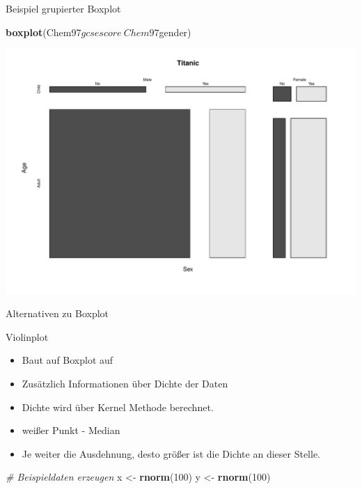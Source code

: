 \documentclass[ignorenonframetext,]{beamer}
\newenvironment{Shaded}{}{}
\newcommand{\KeywordTok}[1]{\textcolor[rgb]{0.00,0.44,0.13}{\textbf{{#1}}}}
\newcommand{\DecValTok}[1]{\textcolor[rgb]{0.25,0.63,0.44}{{#1}}}
\newcommand{\StringTok}[1]{\textcolor[rgb]{0.25,0.44,0.63}{{#1}}}
\newcommand{\CommentTok}[1]{\textcolor[rgb]{0.38,0.63,0.69}{\textit{{#1}}}}
\newcommand{\NormalTok}[1]{{#1}}
\providecommand{\tightlist}{%
\setlength{\itemsep}{0pt}\setlength{\parskip}{0pt}}
\begin{document}
\begin{frame}[fragile]{Beispiel grupierter Boxplot}

\begin{Shaded}
\begin{Highlighting}[]
\KeywordTok{boxplot}\NormalTok{(Chem97$gcsescore~Chem97$gender)}
\end{Highlighting}
\end{Shaded}

\includegraphics{R_intern_files/figure-beamer/unnamed-chunk-215-1.pdf}

\end{frame}

\begin{frame}[fragile]{Alternativen zu Boxplot}

Violinplot

\begin{itemize}
\tightlist
\item
  Baut auf Boxplot auf
\item
  Zusätzlich Informationen über Dichte der Daten
\item
  Dichte wird über Kernel Methode berechnet.
\item
  weißer Punkt - Median
\item
  Je weiter die Ausdehnung, desto größer ist die Dichte an dieser
  Stelle.
\end{itemize}

\begin{Shaded}
\begin{Highlighting}[]
\CommentTok{# Beispieldaten erzeugen}
\NormalTok{x <-}\StringTok{ }\KeywordTok{rnorm}\NormalTok{(}\DecValTok{100}\NormalTok{)}
\NormalTok{y <-}\StringTok{ }\KeywordTok{rnorm}\NormalTok{(}\DecValTok{100}\NormalTok{)}
\end{Highlighting}
\end{Shaded}

\end{frame}
\end{document}
